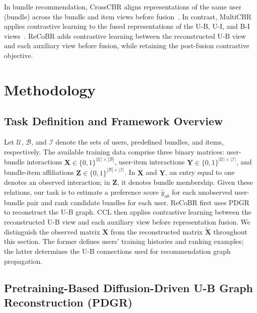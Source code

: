 \documentclass[letterpaper]{article}
\begin{document}
In bundle recommendation, CrossCBR aligns representations of the same user (bundle) across the bundle and item views before fusion~\cite{ma2022crosscbr}. In contrast, MultiCBR applies contrastive learning to the fused representations of the U-B, U-I, and B-I views~\cite{ma2024multicbr}. ReCoBR adds contrastive learning between the reconstructed U-B view and each auxiliary view before fusion, while retaining the post-fusion contrastive objective.






\section{Methodology}\label{sec:methodology}

\subsection{Task Definition and Framework Overview}

Let $\mathcal U$, $\mathcal B$, and $\mathcal I$ denote the sets of users, predefined bundles, and items, respectively. The available training data comprise three binary matrices: user-bundle interactions $\mathbf X\in\{0,1\}^{|\mathcal U|\times|\mathcal B|}$, user-item interactions $\mathbf Y\in\{0,1\}^{|\mathcal U|\times|\mathcal I|}$, and bundle-item affiliations $\mathbf Z\in\{0,1\}^{|\mathcal B|\times|\mathcal I|}$. In $\mathbf X$ and $\mathbf Y$, an entry equal to one denotes an observed interaction; in $\mathbf Z$, it denotes bundle membership. Given these relations, our task is to estimate a preference score $\hat y_{ub}$ for each unobserved user-bundle pair and rank candidate bundles for each user. ReCoBR first uses PDGR to reconstruct the U-B graph. CCL then applies contrastive learning between the reconstructed U-B view and each auxiliary view before representation fusion. We distinguish the observed matrix $\mathbf X$ from the reconstructed matrix $\widetilde{\mathbf X}$ throughout this section. The former defines users' training histories and ranking examples; the latter determines the U-B connections used for recommendation graph propagation.

\subsection{Pretraining-Based Diffusion-Driven U-B Graph Reconstruction (PDGR)}\label{sec:graph-reconstruction}
\end{document}
